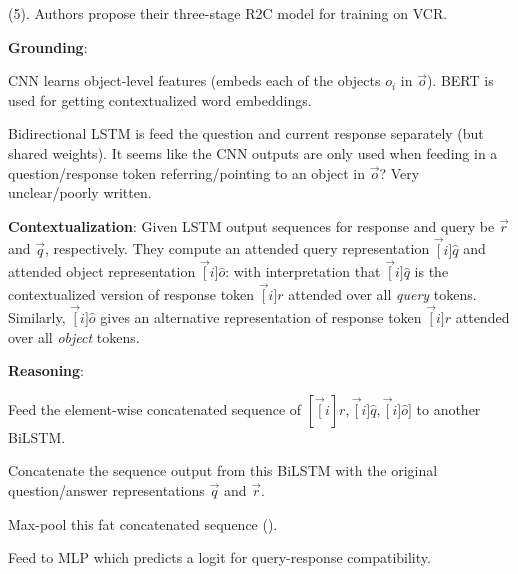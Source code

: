\documentclass[11pt]{article}
\begin{document}



 (5). Authors propose their three-stage R2C model for training on VCR.
\begin{compactenum}
	\item \textbf{Grounding}:
	\begin{compactenum}
		\item CNN learns object-level features (embeds each of the objects $o_i$ in $\vec o$). BERT is used for getting contextualized word embeddings.
		\item Bidirectional LSTM is feed the question and current response separately (but shared weights). It seems like the CNN outputs are only used when feeding in a question/response token referring/pointing to an object in $\vec o$? Very unclear/poorly written.
	\end{compactenum}

	\item \textbf{Contextualization}: Given LSTM output sequences for response and query be $\vec r$ and $\vec q$, respectively. They compute an attended query representation $\vec[i]{\hat q}$ and attended object representation $\vec[i]{\hat o}$:
	with interpretation that $\vec[i]{\hat q}$ is the contextualized version of response token $\vec[i]{r}$ attended over all \textit{query} tokens. Similarly, $\vec[i]{\hat o}$ gives an alternative representation of response token $\vec[i]{r}$ attended over  all \textit{object} tokens.
	
	\item \textbf{Reasoning}:
	\begin{compactitem}
		\item  Feed the element-wise concatenated sequence of $[\vec[i]{r}, \vec[i]{\hat q}, \vec[i]{\hat o}]$ to another BiLSTM.
		\item Concatenate the sequence output from this BiLSTM with the original question/answer representations $\vec q$ and $\vec r$.
		\item Max-pool this fat concatenated sequence ().
		\item Feed to MLP which predicts a logit for query-response compatibility. 
	\end{compactitem}
\end{compactenum}
\end{document}
